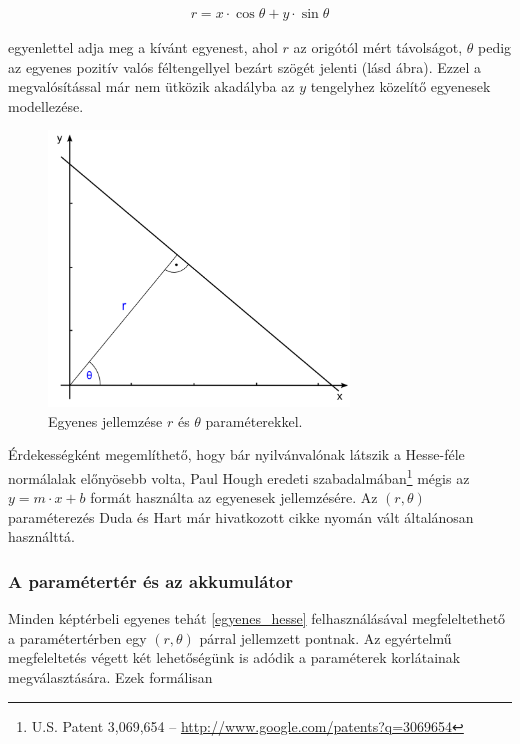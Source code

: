 \begin{align}\label{eq:egyenes_hesse}
r = x \cdot \cos \theta + y \cdot \sin \theta
\end{align}

egyenlettel adja meg a kívánt egyenest, ahol $ r $ az origótól mért távolságot, $ \theta $ pedig az egyenes pozitív valós féltengellyel bezárt szögét jelenti (lásd  ábra). Ezzel a megvalósítással már nem ütközik akadályba az $ y $ tengelyhez közelítő egyenesek modellezése.

\begin{figure}[!ht]
\centering
\includegraphics[width=80mm, keepaspectratio]{figures/repr_line.png}
\caption{Egyenes jellemzése $ r $ és $ \theta $ paraméterekkel.}
\label{fig:repr_line}
\end{figure}

\bigskip

Érdekességként megemlíthető, hogy bár nyilvánvalónak látszik a Hesse-féle normálalak előnyösebb volta, Paul Hough eredeti szabadalmában\footnote{U.S. Patent 3,069,654 -- \url{http://www.google.com/patents?q=3069654}} mégis az $ y = m \cdot x + b $ formát használta az egyenesek jellemzésére. Az $ (r, \theta) $ paraméterezés Duda és Hart már hivatkozott cikke nyomán vált általánosan használttá. \cite{hough_duda}

\subsubsection{A paramétertér és az akkumulátor}\label{sect:parameterter_akkumulator}

Minden képtérbeli egyenes tehát \eqref{egyenes_hesse} felhasználásával megfeleltethető a paramétertérben egy $ (r, \theta) $ párral jellemzett pontnak. Az egyértelmű megfeleltetés végett két lehetőségünk is adódik a paraméterek korlátainak megválasztására. Ezek formálisan

